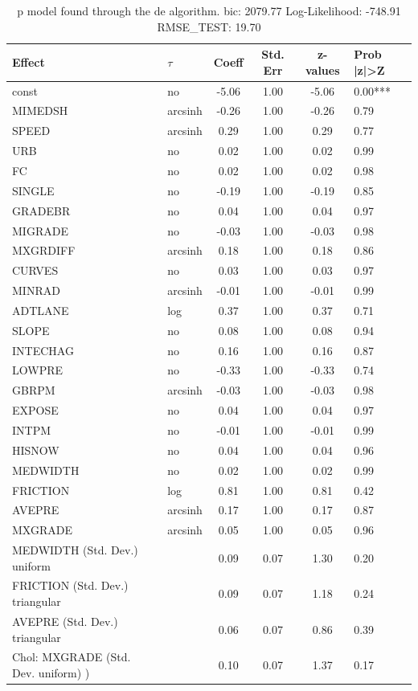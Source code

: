 \begin{table}
	\caption{p model found through the de algorithm. bic: 2079.77 Log-Likelihood: -748.91 RMSE_TEST: 19.70}
	\begin{center}
		\begin{tabular}{|l|l|c|c|c|l|}
			\hline
			Effect & $\tau$ & Coeff & Std. Err & z-values & Prob |z|>Z \\
			\hline
			const & no & -5.06 & 1.00 & -5.06 & 0.00*** \\
			\hline
			MIMEDSH & arcsinh & -0.26 & 1.00 & -0.26 & 0.79 \\
			\hline
			SPEED & arcsinh & 0.29 & 1.00 & 0.29 & 0.77 \\
			\hline
			URB & no & 0.02 & 1.00 & 0.02 & 0.99 \\
			\hline
			FC & no & 0.02 & 1.00 & 0.02 & 0.98 \\
			\hline
			SINGLE & no & -0.19 & 1.00 & -0.19 & 0.85 \\
			\hline
			GRADEBR & no & 0.04 & 1.00 & 0.04 & 0.97 \\
			\hline
			MIGRADE & no & -0.03 & 1.00 & -0.03 & 0.98 \\
			\hline
			MXGRDIFF & arcsinh & 0.18 & 1.00 & 0.18 & 0.86 \\
			\hline
			CURVES & no & 0.03 & 1.00 & 0.03 & 0.97 \\
			\hline
			MINRAD & arcsinh & -0.01 & 1.00 & -0.01 & 0.99 \\
			\hline
			ADTLANE & log & 0.37 & 1.00 & 0.37 & 0.71 \\
			\hline
			SLOPE & no & 0.08 & 1.00 & 0.08 & 0.94 \\
			\hline
			INTECHAG & no & 0.16 & 1.00 & 0.16 & 0.87 \\
			\hline
			LOWPRE & no & -0.33 & 1.00 & -0.33 & 0.74 \\
			\hline
			GBRPM & arcsinh & -0.03 & 1.00 & -0.03 & 0.98 \\
			\hline
			EXPOSE & no & 0.04 & 1.00 & 0.04 & 0.97 \\
			\hline
			INTPM & no & -0.01 & 1.00 & -0.01 & 0.99 \\
			\hline
			HISNOW & no & 0.04 & 1.00 & 0.04 & 0.96 \\
			\hline
			MEDWIDTH & no & 0.02 & 1.00 & 0.02 & 0.99 \\
			\hline
			FRICTION & log & 0.81 & 1.00 & 0.81 & 0.42 \\
			\hline
			AVEPRE & arcsinh & 0.17 & 1.00 & 0.17 & 0.87 \\
			\hline
			MXGRADE & arcsinh & 0.05 & 1.00 & 0.05 & 0.96 \\
			\hline
			MEDWIDTH (Std. Dev.) uniform &  & 0.09 & 0.07 & 1.30 & 0.20 \\
			\hline
			FRICTION (Std. Dev.) triangular &  & 0.09 & 0.07 & 1.18 & 0.24 \\
			\hline
			AVEPRE (Std. Dev.) triangular &  & 0.06 & 0.07 & 0.86 & 0.39 \\
			\hline
			 Chol: MXGRADE (Std. Dev. uniform) ) &  & 0.10 & 0.07 & 1.37 & 0.17 \\
			\hline
		\end{tabular}
	\end{center}
\end{table}